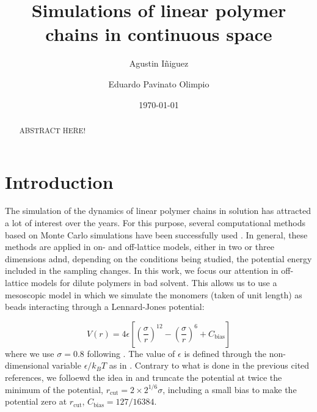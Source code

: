\documentclass[aps,prl,reprint,groupedaddress]{revtex4-1}
\begin{document}
\title{Simulations of linear polymer chains in continuous space}

\author{Agustin I\~niguez}
\author{Eduardo Pavinato Olimpio}


\date{\today}

\begin{abstract}
	ABSTRACT HERE!
\end{abstract}

\maketitle

\section{Introduction}
The simulation of the dynamics of linear polymer chains in solution has attracted a lot of interest over the years. For this purpose, several computational methods based on Monte Carlo simulations have been successfully used \cite{mc_polymer_review}. In general, these methods are applied in on- and off-lattice models, either in two or three dimensions adnd, depending on the conditions being studied, the potential energy included in the sampling changes. In this work, we focus our attention in off-lattice models for dilute polymers in bad solvent. This allows us to use a mesoscopic model in which we simulate the monomers (taken of unit length) as beads interacting through a Lennard-Jones potential:

\begin{equation}
	V(r) = 4 \epsilon \left[\left(\frac{\sigma}{r} \right)^{12} - \left(\frac{\sigma}{r} \right)^{6} + C_{\text{bias}}\right]
\end{equation}
where we use $\sigma = 0.8$ following \cite{Yong1996, ICCPBook}. The value of $\epsilon$ is defined through the non-dimensional variable $\epsilon/k_B T$ as in \cite{Grassberger1997, Yong1996}. Contrary to what is done in the previous cited references, we folloewd the idea in \cite{mc_polymer_review} and truncate the potential at twice the minimum of the potential, $r_{\text{cut}} = 2 \times 2^{1/6} \sigma$, including a small bias to make the potential zero at $r_{\text{cut}}$, $C_{\text{bias}} = 127/16384$.
\end{document}
